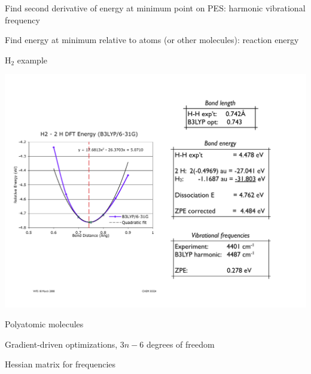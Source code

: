 \documentclass[11pt]{article}
\begin{document}
\begin{outline}
\begin{outline}
  \item Find second derivative of energy at minimum point on PES: harmonic
    vibrational frequency
  \item Find energy at minimum relative to atoms (or other molecules): reaction energy
  \item H$_2$ example
    \begin{center}
      \includegraphics[scale=0.6]{Images/H2-PES}
    \end{center}
  \item Polyatomic molecules
    \begin{outline}
    \item Gradient-driven optimizations, $3n-6$ degrees of freedom
    \item Hessian matrix for frequencies
    \end{outline}
  \end{outline}


\end{outline}
\end{document}
